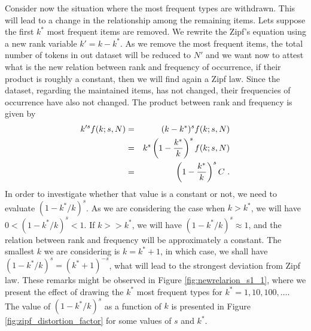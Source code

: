 Consider now the situation where the most frequent types are withdrawn. This will lead 
to a change in the relationship among the remaining items. Lets suppose the first $k^\ast$
most frequent items are removed. We rewrite the Zipf's equation using a new rank
variable $k' = k - k^\ast$. As we remove the most frequent items, the total number of
tokens in out dataset will be reduced to $N'$ and we want now to attest what is the 
new relation between rank and frequency of occurrence, if their product is roughly 
a constant, then we will find again a Zipf law. Since the dataset, regarding the
maintained items, has not changed, their frequencies of occurrence have also not changed.
The product between rank and frequency is given by
\begin{eqnarray}
k'^s f(k; s, N) &=& (k-k^\ast)^s f(k; s, N) \nonumber \\
                &=& k^s \left( 1 - \frac{k^\ast}{k} \right)^s f(k; s, N) \nonumber \\
                &=& \left( 1 - \frac{k^\ast}{k} \right)^s C \textmd{ .}
\end{eqnarray}
In order to investigate whether that value is a constant or not, we need
to evaluate $(1-k^\ast/k)^s$. As we are considering the case when $k > k^\ast$, 
we will have $0 < (1-k^\ast/k)^s < 1$.
If $k >> k^\ast$, we will have $(1-k^\ast/k)^s \approx 1$, and the relation between
rank and frequency will be approximately a constant. The smallest $k$ we are considering
is $k=k^\ast+1$, in which case, we shall have $(1-k^\ast/k)^s = (k^\ast+1)^{-s}$, 
what will lead to the strongest deviation from Zipf law. These remarks might
be observed in Figure \ref{fig:newrelarion_s1_1}, where we present the effect of
drawing the $k^\ast$ most frequent types for $k^\ast = 1,10 , 100, \ldots$. 
The value of $(1-k^\ast/k)^s$ as a function of $k$ is presented in Figure \ref{fig:zipf_distortion_factor}
for some values of $s$ and $k^\ast$.




